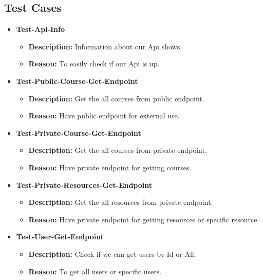 \subsection{Test Cases}
\begin{itemize}
    \item[\textbf{\checkmark}] \textbf{Test-Api-Info}
    \begin{itemize}
        \item \textbf{Description:} Information about our Api shows.
        \item \textbf{Reason:} To easily check if our Api is up.
    \end{itemize}
    
    \item[\textbf{\checkmark}] \textbf{Test-Public-Course-Get-Endpoint}
    \begin{itemize}
        \item \textbf{Description:} Get the all courses from public endpoint.
        \item \textbf{Reason:} Have public endpoint for external use.
    \end{itemize}
    
    \item[\textbf{\checkmark}] \textbf{Test-Private-Course-Get-Endpoint}
    \begin{itemize}
        \item \textbf{Description:} Get the all courses from private endpoint.
        \item \textbf{Reason:} Have private endpoint for getting courses.
    \end{itemize}
    
    \item[\textbf{\checkmark}] \textbf{Test-Private-Resources-Get-Endpoint}
    \begin{itemize}
        \item \textbf{Description:} Get the all resources from private endpoint.
        \item \textbf{Reason:} Have private endpoint for getting resources or specific resource.
    \end{itemize}
    
    \item[\textbf{\checkmark}] \textbf{Test-User-Get-Endpoint}
    \begin{itemize}
        \item \textbf{Description:} Check if we can get users by Id or All.
        \item \textbf{Reason:} To get all users or specific users.
    \end{itemize}
    

\end{itemize}

